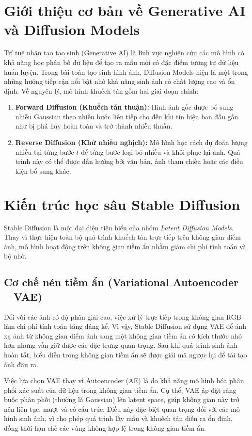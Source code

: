 \documentclass[../main.tex]{subfiles}
\begin{document}
\section{Giới thiệu cơ bản về Generative AI và Diffusion Models}
Trí tuệ nhân tạo tạo sinh (Generative AI) là lĩnh vực nghiên cứu các mô hình có khả năng học phân bố dữ liệu để tạo ra mẫu mới có đặc điểm tương tự dữ liệu huấn luyện. Trong bài toán tạo sinh hình ảnh, Diffusion Models \cite{ho2020denoising} hiện là một trong những hướng tiếp cận nổi bật nhờ khả năng sinh ảnh có chất lượng cao và ổn định. Về nguyên lý, mô hình khuếch tán gồm hai giai đoạn chính:
\begin{enumerate}
    \item \textbf{Forward Diffusion (Khuếch tán thuận):}
    Hình ảnh gốc được bổ sung nhiễu Gaussian theo nhiều bước liên tiếp cho đến khi tín hiệu ban đầu gần như bị phá hủy hoàn toàn và trở thành nhiễu thuần.
    \item \textbf{Reverse Diffusion (Khử nhiễu nghịch):}
    Mô hình học cách dự đoán lượng nhiễu tại từng bước $t$ để từng bước loại bỏ nhiễu và khôi phục lại ảnh. Quá trình này có thể được dẫn hướng bởi văn bản, ảnh tham chiếu hoặc các điều kiện bổ sung khác.
\end{enumerate}

\section{Kiến trúc học sâu Stable Diffusion}
Stable Diffusion \cite{rombach2022latent} là một đại diện tiêu biểu của nhóm \textit{Latent Diffusion Models}. Thay vì thực hiện toàn bộ quá trình khuếch tán trực tiếp trên không gian điểm ảnh, mô hình hoạt động trên không gian tiềm ẩn nhằm giảm chi phí tính toán và bộ nhớ.

\subsection{Cơ chế nén tiềm ẩn (Variational Autoencoder -- VAE)}
Đối với các ảnh có độ phân giải cao, việc xử lý trực tiếp trong không gian RGB làm chi phí tính toán tăng đáng kể. Vì vậy, Stable Diffusion sử dụng VAE để ánh xạ ảnh từ không gian điểm ảnh sang một không gian tiềm ẩn có kích thước nhỏ hơn nhưng vẫn giữ được các đặc trưng quan trọng. Sau khi quá trình sinh ảnh hoàn tất, biểu diễn trong không gian tiềm ẩn sẽ được giải mã ngược lại để tái tạo ảnh đầu ra.

Việc lựa chọn VAE thay vì Autoencoder (AE) là do khả năng mô hình hóa phân phối xác suất của dữ liệu trong không gian tiềm ẩn. Cụ thể, VAE áp đặt ràng buộc phân phối (thường là Gaussian) lên latent space, giúp không gian này trở nên liên tục, mượt và có cấu trúc. Điều này đặc biệt quan trọng đối với các mô hình sinh ảnh, vì cho phép quá trình lấy mẫu và khuếch tán diễn ra ổn định, đồng thời hạn chế các vùng không hợp lệ trong không gian tiềm ẩn.
\end{document}
